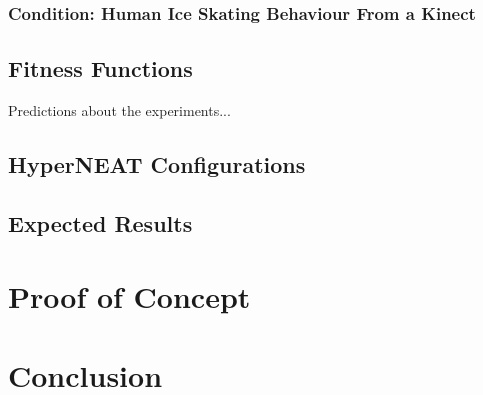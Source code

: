 \documentclass[a4paper,10pt]{article}
\begin{document}
\subsubsection{Condition: Human Ice Skating Behaviour From a Kinect}


\subsection{Fitness Functions}


Predictions about the experiments...


\subsection{HyperNEAT Configurations}

\subsection{Expected Results}



\section{Proof of Concept}
\label{sec:proof-of-concept}


\section{Conclusion}
\label{sec:conclusion}




\end{document}
